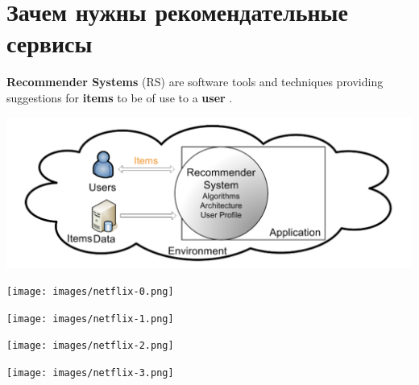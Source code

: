 \documentclass[11pt,aspectratio=169]{beamer}
\begin{document}
\section{Зачем нужны рекомендательные сервисы}

\begin{frame}{}

\vfill
\begin{tcolorbox}[colback=info!5,colframe=info!80,title=]
{\bf Recommender Systems} (RS) are software tools and techniques providing suggestions for {\bf items} to be of use to a {\bf user} \cite{RSHB}.
\end{tcolorbox}
\vfill
\begin{center}
\includegraphics[scale=0.3]{images/overall.png}
\end{center}

\end{frame}

\begin{frame}{}

\begin{center}
\texttt{[image: images/netflix-0.png]}
\end{center}

\end{frame}

\begin{frame}{}

\begin{center}
\texttt{[image: images/netflix-1.png]}
\end{center}

\end{frame}

\begin{frame}{}

\begin{center}
\texttt{[image: images/netflix-2.png]}
\end{center}

\end{frame}

\begin{frame}{}

\begin{center}
\texttt{[image: images/netflix-3.png]}
\end{center}

\end{frame}
\end{document}
